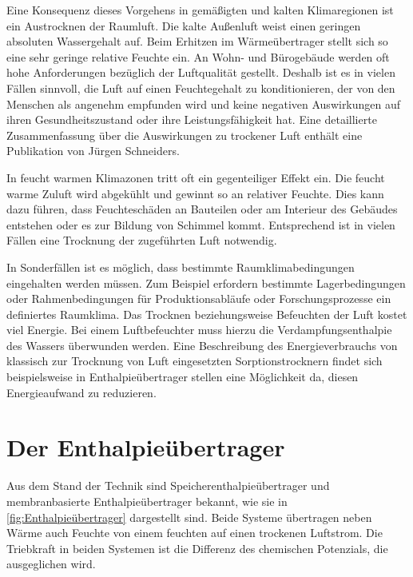 Eine Konsequenz dieses Vorgehens in gemäßigten und kalten Klimaregionen ist ein Austrocknen der Raumluft. Die kalte Außenluft weist einen geringen absoluten Wassergehalt auf. Beim Erhitzen im Wärmeübertrager stellt sich so eine sehr geringe relative Feuchte ein. 
An Wohn- und Bürogebäude werden oft hohe Anforderungen bezüglich der Luftqualität gestellt. Deshalb ist es in vielen Fällen sinnvoll, die Luft auf einen Feuchtegehalt zu konditionieren, der von den Menschen als angenehm empfunden wird und keine negativen Auswirkungen auf ihren Gesundheitszustand oder ihre Leistungsfähigkeit hat. Eine detaillierte Zusammenfassung über die Auswirkungen zu trockener Luft enthält eine Publikation von Jürgen Schneiders.\cite{JurgenSchniedersDr.RainerPflugerDr.WolfgangFeist.Oktober}

In feucht warmen Klimazonen tritt oft ein gegenteiliger Effekt ein. Die feucht warme Zuluft wird abgekühlt und gewinnt so an relativer Feuchte. Dies kann dazu führen, dass Feuchteschäden an Bauteilen oder am Interieur des Gebäudes entstehen oder es zur Bildung von Schimmel kommt. Entsprechend ist in vielen Fällen eine Trocknung der zugeführten Luft notwendig. \cite{Zhang.2010}

In Sonderfällen ist es möglich, dass bestimmte Raumklimabedingungen eingehalten werden müssen. Zum Beispiel erfordern bestimmte Lagerbedingungen oder Rahmenbedingungen für Produktionsabläufe oder Forschungsprozesse ein definiertes Raumklima. 
Das Trocknen beziehungsweise Befeuchten der Luft kostet viel Energie. Bei einem Luftbefeuchter muss hierzu die Verdampfungsenthalpie des Wassers überwunden werden. Eine Beschreibung des Energieverbrauchs von klassisch zur Trocknung von Luft eingesetzten Sorptionstrocknern findet sich beispielsweise in \cite{Zhang.2006}
Enthalpieübertrager stellen eine Möglichkeit da, diesen Energieaufwand zu reduzieren. 

\section{Der Enthalpieübertrager}
\label{Der Enthalpieübertrager}

Aus dem Stand der Technik sind Speicherenthalpieübertrager und membranbasierte Enthalpieübertrager bekannt, wie sie in \ref{fig:Enthalpieübertrager} dargestellt sind. Beide Systeme übertragen neben Wärme auch Feuchte von einem feuchten auf einen trockenen Luftstrom. Die Triebkraft in beiden Systemen ist die Differenz des chemischen Potenzials, die ausgeglichen wird. 

